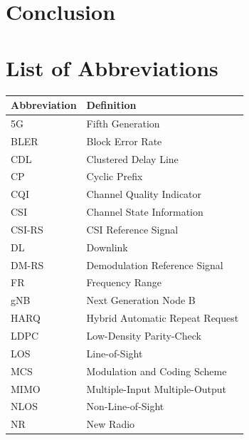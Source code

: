 \documentclass[a4paper,12pt,onecolumn]{article}
\begin{document}
\section*{Conclusion}
	
\newpage
\tableofcontents
\thispagestyle{empty}
\newpage

\section*{List of Abbreviations}
\thispagestyle{empty}

\begin{longtable}{p{3cm}p{10cm}}
	\textbf{Abbreviation} & \textbf{Definition} \\
	\hline
	
	5G      & Fifth Generation \\
	
	BLER    & Block Error Rate \\
	
	CDL     & Clustered Delay Line \\
	CP      & Cyclic Prefix \\
	CQI     & Channel Quality Indicator \\
	CSI     & Channel State Information \\
	CSI-RS  & CSI Reference Signal \\
	
	DL      & Downlink \\
	DM-RS   & Demodulation Reference Signal \\
	
	FR & Frequency Range \\
	
	gNB     & Next Generation Node B \\
	
	HARQ    & Hybrid Automatic Repeat Request \\
	
	LDPC    & Low-Density Parity-Check \\
	LOS     & Line-of-Sight \\
	
	MCS     & Modulation and Coding Scheme \\
	MIMO    & Multiple-Input Multiple-Output \\
	
	NLOS    & Non-Line-of-Sight \\
	NR      & New Radio \\
	

\end{longtable}
\end{document}

